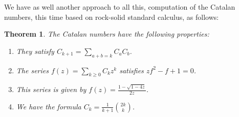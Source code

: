 \documentclass[12pt]{amsbook}
\newtheorem{theorem}{Theorem}[chapter]
\begin{document}
We have as well another approach to all this, computation of the Catalan numbers, this time based on rock-solid standard calculus, as follows:


\begin{theorem}
The Catalan numbers have the following properties:
\begin{enumerate}
\item They satisfy $C_{k+1}=\sum_{a+b=k}C_aC_b$.

\item The series $f(z)=\sum_{k\geq0}C_kz^k$ satisfies $zf^2-f+1=0$.

\item This series is given by $f(z)=\frac{1-\sqrt{1-4z}}{2z}$.

\item We have the formula $C_k=\frac{1}{k+1}\binom{2k}{k}$.
\end{enumerate}
\end{theorem}
\end{document}
